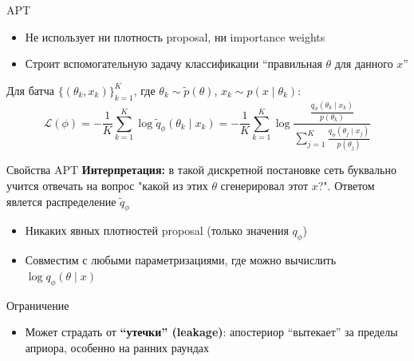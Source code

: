 \documentclass[10pt,aspectratio=169]{beamer}
\begin{document}
\begin{frame}{APT}
    \begin{itemize}
        \item Не использует ни плотность proposal, ни importance weights
        \item Строит вспомогательную задачу классификации ``правильная $\theta$ для данного $x$''
    \end{itemize}
    \pause
    Для батча $\{(\theta_k, x_k)\}_{k=1}^K$, где $\theta_k\sim\tilde{p}(\theta)$, $x_k\sim p(x\mid\theta_k)$:
    \[
    \mathcal{L}(\phi) = -\frac{1}{K}\sum_{k=1}^K \log \tilde{q}_\phi (\theta_k \mid x_k) = -\frac{1}{K}\sum_{k=1}^K \log\frac{\frac{q_\phi (\theta_k \mid x_k)}{p(\theta_k)}}{\sum_{j = 1}^{K} \frac{q_\phi (\theta_j \mid x_j)}{p(\theta_j)}}
    \]
\end{frame}

\begin{frame}{Свойства APT}
    \textbf{Интерпретация:} в такой дискретной постановке сеть буквально учится отвечать на вопрос "какой из этих $\theta$ сгенерировал этот $x$?". 
    Ответом явлется распределение $\tilde{q}_\phi$ 
    \pause
    \begin{itemize}
        \item Никаких явных плотностей proposal (только значения $q_\phi$)
        \item Совместим с любыми параметризациями, где можно вычислить $\log q_\phi(\theta\mid x)$
    \end{itemize}
    \pause
    \begin{block}{Ограничение}
        \begin{itemize}
            \item Может страдать от \textbf{``утечки'' (leakage)}: апостериор ``вытекает'' за пределы априора, особенно на ранних раундах
        \end{itemize}
    \end{block}
\end{frame}
\end{document}
